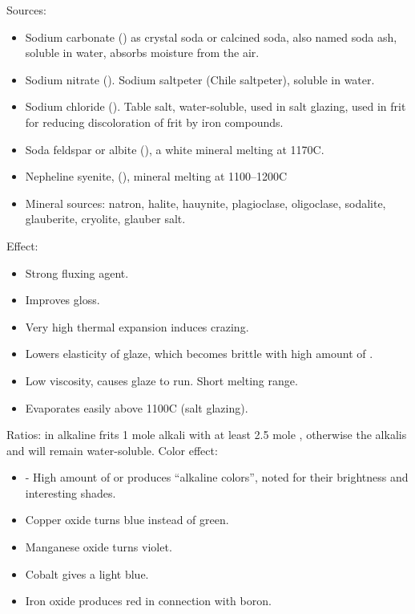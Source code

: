 Sources:
\begin{itemize}
  \item Sodium carbonate () as crystal soda or calcined soda, also 
  named soda ash, soluble in water, absorbs moisture from the air.
  \item Sodium nitrate (). Sodium saltpeter (Chile saltpeter), 
  soluble in water.
  \item Sodium chloride (). Table salt, water-soluble, used in salt 
  glazing, used in frit for reducing discoloration of frit by iron compounds.
  \item Soda feldspar or albite (), a white mineral melting 
  at 1170\degree C.
  \item Nepheline syenite, (), mineral melting at 
  1100\degree --1200\degree C
  \item Mineral sources: natron, halite, hauynite, plagioclase, oligoclase, 
  sodalite, glauberite, cryolite, glauber salt.
\end{itemize}
Effect:
\begin{itemize}
  \item Strong fluxing agent.
  \item Improves gloss.
  \item Very high thermal expansion induces crazing.
  \item Lowers elasticity of glaze, which becomes brittle with high amount of 
  .
  \item Low viscosity, causes glaze to run. Short melting range.
  \item Evaporates easily above 1100\degree C (salt glazing).
\end{itemize}
Ratios: in alkaline frits 1 mole alkali with at least 2.5 mole , 
otherwise the alkalis  and  will remain water-soluble.
Color effect:
\begin{itemize}
  \item - High amount of  or  produces ``alkaline colors'', 
  noted for their brightness and interesting shades.
  \item Copper oxide turns blue instead of green.
  \item Manganese oxide turns violet.
  \item Cobalt gives a light blue.
  \item Iron oxide produces red in connection with boron.
\end{itemize}
